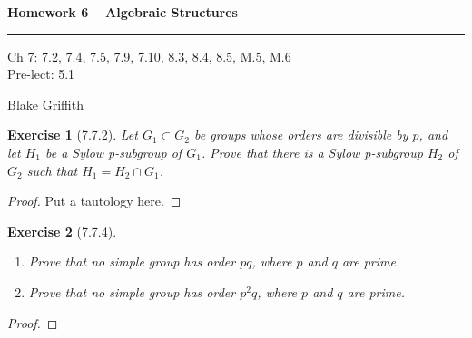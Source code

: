 \documentclass[12pt]{article}
\newtheorem*{exer}{Exercise}
\begin{document}
\textbf{Homework 6 -- Algebraic Structures} \\

\hrule

\begin{minipage}{.80\linewidth}
    \flushleft
    Ch 7: 7.2, 7.4, 7.5, 7.9, 7.10, 8.3, 8.4, 8.5, M.5, M.6 \\ 
    Pre-lect: 5.1 \\
\end{minipage}
\begin{minipage}{.20\linewidth}
    \flushright
    Blake Griffith
\end{minipage}


\begin{exer}[7.7.2]

    Let $G_1 \subset G_2$ be groups whose orders are divisible by $p$,
    and let $H_1$ be a Sylow p-subgroup of $G_1$. Prove that there is a
    Sylow p-subgroup $H_2$ of $G_2$ such that $H_1 = H_2 \cap G_1$.

\end{exer}

\begin{proof}

    Put a tautology here.

\end{proof}


\begin{exer}[7.7.4]

    \begin{enumerate}
        \item Prove that no simple group has order $pq$, where $p$ and
            $q$ are prime.

        \item Prove that no simple group has order $p^2q$, where $p$ and
            $q$ are prime.

    \end{enumerate}

\end{exer}

\begin{proof}

\end{proof}
\end{document}
